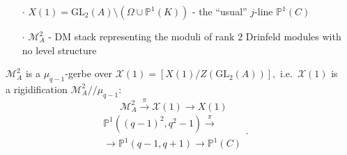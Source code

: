 \documentclass[handout]{beamer}
\numberwithin{equation}{section}
\numberwithin{case}{theorem}
\newcommand{\cH}{\mathcal{H}}		%
\newcommand{\cM}{\mathcal{M}}		%
\newcommand{\sX}{\mathscr{X}}		%
\newcommand{\bbP}{\mathbb{P}}		%
\newcommand{\bbQ}{\mathbb{Q}}		%
\newcommand{\bbZ}{\mathbb{Z}}		%
\newcommand{\GL}{\mathrm{GL}} 	%
\newcommand{\PSL}{\mathrm{PSL}} 	%
\newcommand{\<}{\left\langle}
\renewcommand{\>}{\right\rangle}
\begin{document}
\begin{frame}
\begin{columns}
\begin{column}{.5\textwidth}
			\end{column}
			\pause
			\begin{column}{.5\textwidth}
				\begin{example}
					\begin{itemize}
						\item[$\cdot$] $X(1)=\GL_2(A)\setminus(\Omega\cup\bbP^1(K))$ - the ``usual'' $j$-line $\bbP^1(C)$ \pause
						\item[$\cdot$] $\cM^2_A$ - DM stack representing the moduli of rank $2$ Drinfeld modules with no level structure \pause
					\end{itemize}
					$\cM^2_A$ is a $\mu_{q-1}$-gerbe over $\sX(1)=[X(1)/Z(\GL_2(A))],$ \pause i.e.\ $\sX(1)$ is a rigidification $\cM^2_A/\!/\mu_{q-1}$: \pause
					\[\cM^2_A\overset{\pi}{\to}\sX(1)\to X(1)\] \pause
					\[\begin{array}{ll}
					\bbP^1((q-1)^2,q^2-1)\overset{\pi}{\to}\\\to\bbP^1(q-1,q+1)\to \bbP^1(C)\end{array}.\]
				\end{example}
			\end{column}
		\end{columns}
	\end{frame}
	
\end{document}
